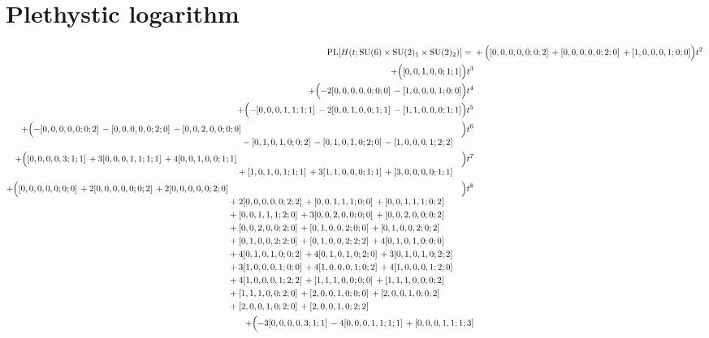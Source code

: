 \documentclass[10pt]{article}
\begin{document}
\section{Plethystic logarithm}
\[
\begin{aligned}
\operatorname{PL}[H(t;\mathrm{SU}(6)\times\mathrm{SU(2)_1}\times\mathrm{SU(2)_2})] ={}&
  + \Bigl([0,0,0,0,0;0;2]\,+[0,0,0,0,0;2;0]\,+[1,0,0,0,1;0;0]\Bigr)t^{2} \\
  + \Bigl([0,0,1,0,0;1;1]\Bigr)t^{3} \\
  + \Bigl(-2[0,0,0,0,0;0;0]\,-[1,0,0,0,1;0;0]\Bigr)t^{4} \\
  + \Bigl(-[0,0,0,1,1;1;1]\,-2[0,0,1,0,0;1;1]\,-[1,1,0,0,0;1;1]\Bigr)t^{5} \\
  + \Bigl(\begin{aligned}[t]-[0,0,0,0,0;0;2]\,-[0,0,0,0,0;2;0]\,-[0,0,2,0,0;0;0] \\
  &{}-[0,1,0,1,0;0;2]\,-[0,1,0,1,0;2;0]\,-[1,0,0,0,1;2;2]\end{aligned}\Bigr)t^{6} \\
  + \Bigl(\begin{aligned}[t][0,0,0,0,3;1;1]\,+3[0,0,0,1,1;1;1]\,+4[0,0,1,0,0;1;1] \\
  &{}+[1,0,1,0,1;1;1]\,+3[1,1,0,0,0;1;1]\,+[3,0,0,0,0;1;1]\end{aligned}\Bigr)t^{7} \\
  + \Bigl(\begin{aligned}[t][0,0,0,0,0;0;0]\,+2[0,0,0,0,0;0;2]\,+2[0,0,0,0,0;2;0] \\
  &{}+2[0,0,0,0,0;2;2]\,+[0,0,1,1,1;0;0]\,+[0,0,1,1,1;0;2] \\
  &{}+[0,0,1,1,1;2;0]\,+3[0,0,2,0,0;0;0]\,+[0,0,2,0,0;0;2] \\
  &{}+[0,0,2,0,0;2;0]\,+[0,1,0,0,2;0;0]\,+[0,1,0,0,2;0;2] \\
  &{}+[0,1,0,0,2;2;0]\,+[0,1,0,0,2;2;2]\,+4[0,1,0,1,0;0;0] \\
  &{}+4[0,1,0,1,0;0;2]\,+4[0,1,0,1,0;2;0]\,+3[0,1,0,1,0;2;2] \\
  &{}+3[1,0,0,0,1;0;0]\,+4[1,0,0,0,1;0;2]\,+4[1,0,0,0,1;2;0] \\
  &{}+4[1,0,0,0,1;2;2]\,+[1,1,1,0,0;0;0]\,+[1,1,1,0,0;0;2] \\
  &{}+[1,1,1,0,0;2;0]\,+[2,0,0,1,0;0;0]\,+[2,0,0,1,0;0;2] \\
  &{}+[2,0,0,1,0;2;0]\,+[2,0,0,1,0;2;2]\end{aligned}\Bigr)t^{8} \\
  + \Bigl(\begin{aligned}[t]-3[0,0,0,0,3;1;1]\,-4[0,0,0,1,1;1;1]\,+[0,0,0,1,1;1;3] \\

\end{aligned}
\end{aligned}\]
\end{document}
